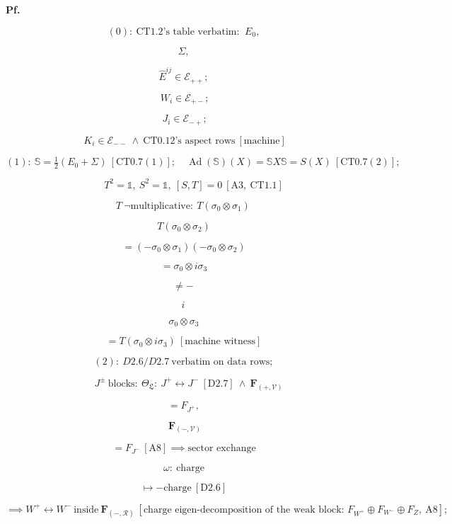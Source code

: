 \begin{theorem}
\textbf{Pf.}

\[
(0):\ \text{CT1.2's table verbatim: }\ E_0,
\]

\[
\Sigma,
\]

\[
\hat E^{ij}\in\mathcal E_{++};
\]

\[
\ W_i\in\mathcal E_{+-};
\]

\[
\ J_i\in\mathcal E_{-+};
\]

\[
\ K_i\in\mathcal E_{--}\ \wedge\ \text{CT0.12's aspect rows}\ [\text{machine}]
\]

\[
(1):\ \mathbb S=\tfrac12(E_0+\Sigma)\ [\mathrm{CT0.7}(1)];\quad \operatorname{Ad}(\mathbb S)(X)=\mathbb S X\mathbb S=S(X)\ [\mathrm{CT0.7}(2)];
\]

\[
\qquad T^2=\mathbb 1,\ S^2=\mathbb 1,\ [S,T]=0\ [\mathrm{A3},\ \mathrm{CT1.1}]
\]

\[
T\ \neg\text{multiplicative}:\ T(\sigma_0\otimes\sigma_1)\,
\]

\[
T(\sigma_0\otimes\sigma_2)
\]

\[
= (-\sigma_0\otimes\sigma_1)(-\sigma_0\otimes\sigma_2)
\]

\[
= \sigma_0\otimes i\sigma_3
\]

\[
\ne -\,
\]

\[
i\,
\]

\[
\sigma_0\otimes\sigma_3
\]

\[
= T(\sigma_0\otimes i\sigma_3)\ [\text{machine witness}]
\]

\[
(2):\ D2.6/D2.7\ \text{verbatim on data rows};
\]

\[
\quad J^\pm\ \text{blocks}:\ \Theta_{\mathfrak L}:\ J^+\leftrightarrow J^-\ [\mathrm{D2.7}]\ \wedge\ \mathbf F_{(+,\mathcal V)}
\]

\[
= F_{J^+},
\]

\[
\ \mathbf F_{(-,\mathcal V)}
\]

\[
= F_{J^-}\ [\mathrm{A8}]\implies\text{sector exchange}
\]

\[
\omega:\ \text{charge}
\]

\[
\mapsto -\text{charge}\ [\mathrm{D2.6}]
\]

\[
\implies W^+\leftrightarrow W^-\ \text{inside}\ \mathbf F_{(-,\mathcal R)}\ [\text{charge eigen-decomposition of the weak block: }F_{W^+}\oplus F_{W^-}\oplus F_Z,\ \mathrm{A8}];
\]


\end{theorem}

